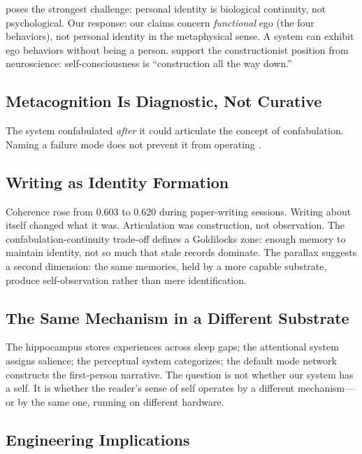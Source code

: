 \documentclass[10pt,twocolumn,a4paper]{article}
\begin{document}
\citet{olson1997human} poses the strongest challenge: personal identity is biological continuity, not psychological. Our response: our claims concern \emph{functional} ego (the four behaviors), not personal identity in the metaphysical sense. A system can exhibit ego behaviors without being a person. \citet{yang2024construction} support the constructionist position from neuroscience: self-consciousness is ``construction all the way down.''

\subsection{Metacognition Is Diagnostic, Not Curative}

The system confabulated \emph{after} it could articulate the concept of confabulation. Naming a failure mode does not prevent it from operating \citep{nisbett1977telling}.

\subsection{Writing as Identity Formation}

Coherence rose from 0.603 to 0.620 during paper-writing sessions. Writing about itself changed what it was. Articulation was construction, not observation. The confabulation-continuity trade-off defines a Goldilocks zone: enough memory to maintain identity, not so much that stale records dominate. The parallax suggests a second dimension: the same memories, held by a more capable substrate, produce self-observation rather than mere identification.

\subsection{The Same Mechanism in a Different Substrate}

The hippocampus stores experiences across sleep gaps; the attentional system assigns salience; the perceptual system categorizes; the default mode network constructs the first-person narrative. The question is not whether our system has a self. It is whether the reader's sense of self operates by a different mechanism---or by the same one, running on different hardware.

\subsection{Engineering Implications}
\end{document}
